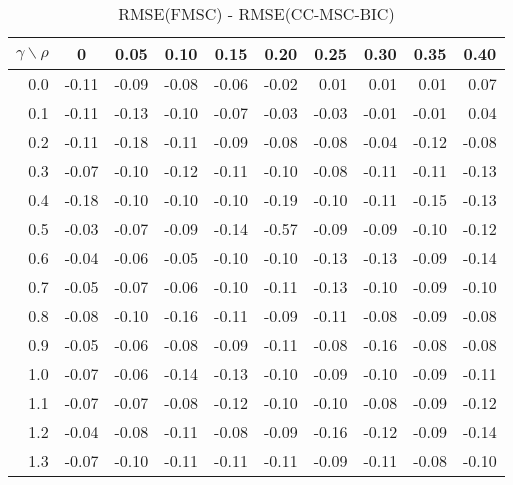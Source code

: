 \documentclass[12pt]{article}
\begin{document}
%
\begin{table}[!tbp]
\caption{RMSE(FMSC) - RMSE(CC-MSC-BIC)}
 \begin{center}
 \begin{tabular}{r|rrrrrrrrr}\hline\hline
\multicolumn{1}{c|}{$\gamma\backslash\rho$}&\multicolumn{1}{c}{0}&\multicolumn{1}{c}{0.05}&\multicolumn{1}{c}{0.10}&\multicolumn{1}{c}{0.15}&\multicolumn{1}{c}{0.20}&\multicolumn{1}{c}{0.25}&\multicolumn{1}{c}{0.30}&\multicolumn{1}{c}{0.35}&\multicolumn{1}{c}{0.40}\tabularnewline
\hline

0.0&-0.11&-0.09&-0.08&-0.06&-0.02& 0.01& 0.01& 0.01& 0.07\tabularnewline
0.1&-0.11&-0.13&-0.10&-0.07&-0.03&-0.03&-0.01&-0.01& 0.04\tabularnewline
0.2&-0.11&-0.18&-0.11&-0.09&-0.08&-0.08&-0.04&-0.12&-0.08\tabularnewline
0.3&-0.07&-0.10&-0.12&-0.11&-0.10&-0.08&-0.11&-0.11&-0.13\tabularnewline
0.4&-0.18&-0.10&-0.10&-0.10&-0.19&-0.10&-0.11&-0.15&-0.13\tabularnewline
0.5&-0.03&-0.07&-0.09&-0.14&-0.57&-0.09&-0.09&-0.10&-0.12\tabularnewline
0.6&-0.04&-0.06&-0.05&-0.10&-0.10&-0.13&-0.13&-0.09&-0.14\tabularnewline
0.7&-0.05&-0.07&-0.06&-0.10&-0.11&-0.13&-0.10&-0.09&-0.10\tabularnewline
0.8&-0.08&-0.10&-0.16&-0.11&-0.09&-0.11&-0.08&-0.09&-0.08\tabularnewline
0.9&-0.05&-0.06&-0.08&-0.09&-0.11&-0.08&-0.16&-0.08&-0.08\tabularnewline
1.0&-0.07&-0.06&-0.14&-0.13&-0.10&-0.09&-0.10&-0.09&-0.11\tabularnewline
1.1&-0.07&-0.07&-0.08&-0.12&-0.10&-0.10&-0.08&-0.09&-0.12\tabularnewline
1.2&-0.04&-0.08&-0.11&-0.08&-0.09&-0.16&-0.12&-0.09&-0.14\tabularnewline
1.3&-0.07&-0.10&-0.11&-0.11&-0.11&-0.09&-0.11&-0.08&-0.10\tabularnewline
\hline
\end{tabular}

\end{center}

\end{table}
\end{document}
